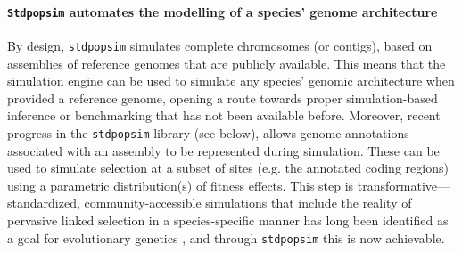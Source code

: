 \documentclass[hidelinks]{article}
\newcommand{\Stdpopsim}{\texttt{Stdpopsim}\xspace}
\newcommand{\stdpopsim}{\texttt{stdpopsim}\xspace}
\begin{document}
\paragraph*{\Stdpopsim automates the modelling of a species' genome architecture}
By design, \stdpopsim simulates complete chromosomes (or contigs),
based on assemblies of reference genomes that are publicly available.
This means that the simulation engine can be used to simulate any species'
genomic architecture when provided a reference genome, opening a route towards
proper simulation-based inference or benchmarking that has not been available before.
Moreover, recent progress in the \stdpopsim library (see below), allows
genome annotations associated with an assembly to be represented during simulation.
These can be used to simulate selection at a subset of sites (e.g. the annotated coding regions)
using a parametric distribution(s) of fitness effects.
This step is transformative---standardized, community-accessible simulations
that include the reality of pervasive linked selection in a species-specific
manner has long been identified as a goal for evolutionary genetics
\cite[e.g.,][]{McVicker2009,comeron2014background}, and through \stdpopsim
this is now achievable.


%
%
%



\end{document}
